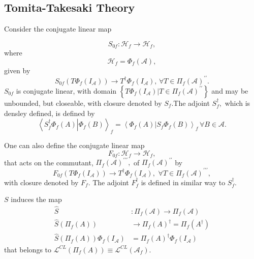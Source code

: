 \documentclass[aps,preprint]{revtex4}%
\begin{document}
\subsection{Tomita-Takesaki Theory}

Consider the conjugate linear map %

\begin{equation}
S_{0f}:\mathcal{H}_{f}\rightarrow\mathcal{H}_{f},
\end{equation}
where
\begin{equation}
\mathcal{H}_{f}=\Phi_{f}\left(  \mathcal{A}\right)  ,
\end{equation}
given by%
\begin{equation}
S_{0f}\left(  T\Phi_{f}\left(  I_{\mathcal{A}}\right)  \right)  \rightarrow
T^{\dagger}\Phi_{f}\left(  I_{\mathcal{A}}\right)  ,\,\forall T\in\Pi
_{f}\left(  \mathcal{A}\right)  ^{\prime\prime}.
\end{equation}
$S_{0f}$ is conjugate linear, with domain $\left\{  \left.  T\Phi_{f}\left(
I_{\mathcal{A}}\right)  \right\vert T\in\Pi_{f}\left(  \mathcal{A}\right)
^{\prime\prime}\right\}  $ and may be unbounded, but closeable, with closure
denoted by $S_{f}.$The adjoint $S_{f}^{\dagger},$ which is densley defined, is
defined by
\begin{equation}
\left\langle \left.  S_{f}^{\dagger}\Phi_{f}\left(  A\right)  \right\vert
\Phi_{f}\left(  B\right)  \right\rangle _{f}=\left\langle \left.  \Phi
_{f}\left(  A\right)  \right\vert S_{f}\Phi_{f}\left(  B\right)  \right\rangle
_{f}\,\forall B\in\mathcal{A}.
\end{equation}


One can also define the conjugate linear map
\begin{equation}
F_{0f}:\mathcal{H}_{f}\rightarrow\mathcal{H}_{f},
\end{equation}
that acts on the commutant, $\Pi_{f}\left(  \mathcal{A}\right)  ^{\prime
\prime\prime},$ of $\Pi_{f}\left(  \mathcal{A}\right)  ^{\prime\prime}$ by%
\begin{equation}
F_{0f}\left(  T\Phi_{f}\left(  I_{\mathcal{A}}\right)  \right)  \rightarrow
T^{\dagger}\Phi_{f}\left(  I_{\mathcal{A}}\right)  ,\,\,\forall T\in\Pi
_{f}\left(  \mathcal{A}\right)  ^{\prime\prime\prime},
\end{equation}
with closure denoted by $F_{f}.$ The adjoint $F_{f}^{\dagger}$ is defined in
similar way to $S_{f}^{\dagger}.$

$S$ induces the map
\begin{align*}
\widehat{S} &  :\Pi_{f}\left(  \mathcal{A}\right)  \rightarrow\Pi_{f}\left(
\mathcal{A}\right)  \\
\widehat{S}\left(  \Pi_{f}\left(  A\right)  \right)   &  \rightarrow\Pi
_{f}\left(  A\right)  ^{\dagger}=\Pi_{f}\left(  A^{\dagger}\right)  \\
\widehat{S}\left(  \Pi_{f}\left(  A\right)  \right)  \Phi_{f}\left(
I_{\mathcal{A}}\right)   &  =\Pi_{f}\left(  A\right)  ^{\dagger}\Phi
_{f}\left(  I_{\mathcal{A}}\right)
\end{align*}
that belongs to $\mathcal{L}^{CL}\left(  \Pi_{f}\left(  A\right)  \right)
\equiv\mathcal{L}^{CL}\left(  \mathcal{A}_{f}\right)  .$
\end{document}
